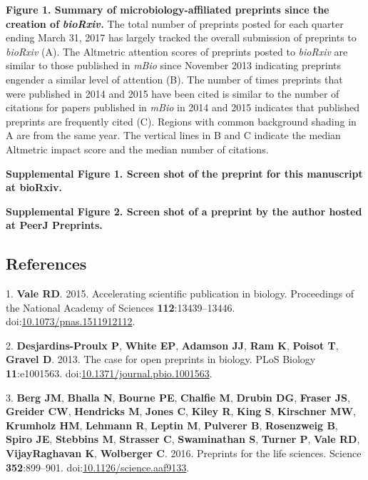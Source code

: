 \documentclass[11pt,]{article}
\begin{document}
\newpage

\textbf{Figure 1. Summary of microbiology-affiliated preprints since the
creation of} \textbf{\emph{bioRxiv.}} The total number of preprints
posted for each quarter ending March 31, 2017 has largely tracked the
overall submission of preprints to \emph{bioRxiv} (A). The Altmetric
attention scores of preprints posted to \emph{bioRxiv} are similar to
those published in \emph{mBio} since November 2013 indicating preprints
engender a similar level of attention (B). The number of times preprints
that were published in 2014 and 2015 have been cited is similar to the
number of citations for papers published in \emph{mBio} in 2014 and 2015
indicates that published preprints are frequently cited (C). Regions
with common background shading in A are from the same year. The vertical
lines in B and C indicate the median Altmetric impact score and the
median number of citations.

\textbf{Supplemental Figure 1. Screen shot of the preprint for this
manuscript at bioRxiv.}

\textbf{Supplemental Figure 2. Screen shot of a preprint by the author
hosted at PeerJ Preprints.}

\newpage

\subsection*{References}\label{references}

\hypertarget{refs}{}
\hypertarget{ref-Vale2015}{}
1. \textbf{Vale RD}. 2015. Accelerating scientific publication in
biology. Proceedings of the National Academy of Sciences
\textbf{112}:13439--13446.
doi:\href{https://doi.org/10.1073/pnas.1511912112}{10.1073/pnas.1511912112}.

\hypertarget{ref-DesjardinsProulx2013}{}
2. \textbf{Desjardins-Proulx P}, \textbf{White EP}, \textbf{Adamson JJ},
\textbf{Ram K}, \textbf{Poisot T}, \textbf{Gravel D}. 2013. The case for
open preprints in biology. PLoS Biology \textbf{11}:e1001563.
doi:\href{https://doi.org/10.1371/journal.pbio.1001563}{10.1371/journal.pbio.1001563}.

\hypertarget{ref-Berg2016}{}
3. \textbf{Berg JM}, \textbf{Bhalla N}, \textbf{Bourne PE},
\textbf{Chalfie M}, \textbf{Drubin DG}, \textbf{Fraser JS},
\textbf{Greider CW}, \textbf{Hendricks M}, \textbf{Jones C},
\textbf{Kiley R}, \textbf{King S}, \textbf{Kirschner MW},
\textbf{Krumholz HM}, \textbf{Lehmann R}, \textbf{Leptin M},
\textbf{Pulverer B}, \textbf{Rosenzweig B}, \textbf{Spiro JE},
\textbf{Stebbins M}, \textbf{Strasser C}, \textbf{Swaminathan S},
\textbf{Turner P}, \textbf{Vale RD}, \textbf{VijayRaghavan K},
\textbf{Wolberger C}. 2016. Preprints for the life sciences. Science
\textbf{352}:899--901.
doi:\href{https://doi.org/10.1126/science.aaf9133}{10.1126/science.aaf9133}.
\end{document}
